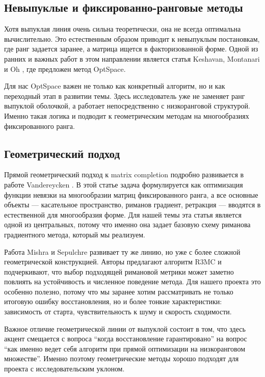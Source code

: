 \documentclass[a4paper,12pt]{article}
\begin{document}
\subsection{Невыпуклые и фиксированно-ранговые методы}

Хотя выпуклая линия очень сильна теоретически, она не всегда оптимальна вычислительно. Это естественным образом приводит к невыпуклым постановкам, где ранг задается заранее, а матрица ищется в факторизованной форме. Одной из ранних и важных работ в этом направлении является статья Keshavan, Montanari и Oh \cite{keshavan}, где предложен метод OptSpace.

Для нас OptSpace важен не только как конкретный алгоритм, но и как переходный этап в развитии темы. Здесь исследователь уже не заменяет ранг выпуклой оболочкой, а работает непосредственно с низкоранговой структурой. Именно такая логика и подводит к геометрическим методам на многообразиях фиксированного ранга.

\subsection{Геометрический подход}

Прямой геометрический подход к matrix completion подробно развивается в работе Vandereycken \cite{vandereycken}. В этой статье задача формулируется как оптимизация функции невязки на многообразии матриц фиксированного ранга, а все основные объекты --- касательное пространство, риманов градиент, ретракция --- вводятся в естественной для многообразия форме. Для нашей темы эта статья является одной из центральных, потому что именно она задает базовую схему риманова градиентного метода, который мы реализуем.

Работа Mishra и Sepulchre \cite{r3mc} развивает ту же линию, но уже с более сложной геометрической конструкцией. Авторы предлагают алгоритм R3MC и подчеркивают, что выбор подходящей римановой метрики может заметно повлиять на устойчивость и численное поведение метода. Для нашего проекта это особенно полезно, потому что мы заранее хотим рассматривать не только итоговую ошибку восстановления, но и более тонкие характеристики: зависимость от старта, чувствительность к шуму и скорость сходимости.

Важное отличие геометрической линии от выпуклой состоит в том, что здесь акцент смещается с вопроса ``когда восстановление гарантировано'' на вопрос ``как именно ведет себя алгоритм при прямой оптимизации на низкоранговом множестве''. Именно поэтому геометрические методы хорошо подходят для проекта с исследовательским уклоном.
\end{document}
